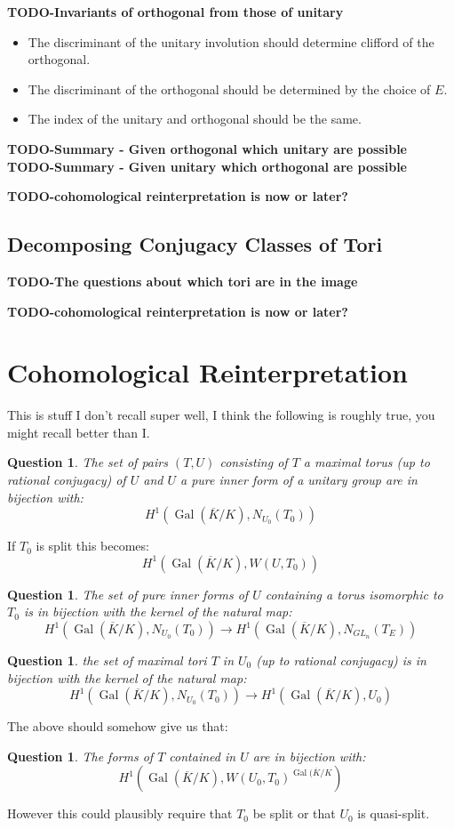 \documentclass{article}
\theoremstyle{plain}
\newtheorem{question}[theorem]{Question}
\theoremstyle{definition}
\numberwithin{equation}{section}
\DeclareMathOperator{\Gal}{Gal}
\newcommand{\TODO}[1]{\textbf{TODO-#1}}
\begin{document}
\TODO{Invariants of orthogonal from those of unitary}
\begin{itemize}
\item The discriminant of the unitary involution should determine clifford of the orthogonal.
\item The discriminant of the orthogonal should be determined by the choice of $E$.
\item The index of the unitary and orthogonal should be the same.
\end{itemize}

\TODO{Summary - Given orthogonal which unitary are possible}
\TODO{Summary - Given unitary which orthogonal are possible}

\TODO{cohomological reinterpretation is now or later?}

\subsection{Decomposing Conjugacy Classes of Tori}

\TODO{The questions about which tori are in the image}


\TODO{cohomological reinterpretation is now or later?}

\section{Cohomological Reinterpretation}

This is stuff I don't recall super well, I think the following is roughly true, you might recall better than I.

\begin{question}
The set of pairs $(T,U)$ consisting of $T$ a maximal torus (up to rational conjugacy) of $U$ and $U$ a pure inner form of a unitary group are in bijection with:
\[ H^1( \Gal(\overline{K}/K), N_{U_0}(T_0) ) \]
\end{question}
If $T_0$ is split this becomes:
\[ H^1( \Gal(\overline{K}/K), W(U,T_0) ) \]

\begin{question}
The set of pure inner forms of $U$ containing a torus isomorphic to $T_0$ is in bijection with the kernel of the natural map:
\[ H^1( \Gal(\overline{K}/K), N_{U_0}(T_0) ) \rightarrow H^1( \Gal(\overline{K}/K),N_{GL_n}(T_E )) \]
\end{question}

\begin{question}
the set of maximal tori $T$ in $U_0$ (up to rational conjugacy) is in bijection with the kernel of the natural map:
\[  H^1( \Gal(\overline{K}/K), N_{U_0}(T_0) ) \rightarrow H^1( \Gal(\overline{K}/K), U_0) \]
\end{question}

The above should somehow give us that:
\begin{question}
The forms of $T$ contained in $U$ are in bijection with:
\[ H^1(\Gal(\overline{K}/K), W(U_0,T_0)^{\Gal(\overline{K}/K} ) \]
\end{question}
However this could plausibly require that $T_0$ be split or that $U_0$ is quasi-split.
\end{document}
